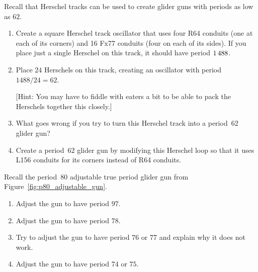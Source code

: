\begin{multicols}{2}
	
	\mfilbreak
	
	
	\begin{problem}\label{exer:p62_gun_problem}
		Recall that Herschel tracks can be used to create glider guns with periods as low as $62$.\smallskip
		
		\begin{enumerate}[label=\bf\color{ocre}(\alph*)]
			\item {} Create a square Herschel track oscillator that uses four R64 conduits (one at each of its corners) and 16 Fx77 conduits (four on each of its sides). If you place just a single Herschel on this track, it should have period $1{\,}488$.
			
			\item {} Place $24$ Herschels on this track, creating an oscillator with period $1488/24 = 62$.
			
			[Hint: You may have to fiddle with eaters a bit to be able to pack the Herschels together this closely.]
			
			\item {} What goes wrong if you try to turn this Herschel track into a period~62 glider gun? %
			
			\item {} Create a period~$62$ glider gun by modifying this Herschel loop so that it uses L156 conduits for its corners instead of R64 conduits.
		\end{enumerate}
	\end{problem}
	
	
	\mfilbreak
	
	
	\begin{problemstar}\label{exer:p80_adjustable_manipulate} 
		Recall the period~$80$ adjustable true period glider gun from Figure~\ref{fig:p80_adjustable_gun}.\smallskip
		
		\begin{enumerate}[label=\bf\color{ocre}(\alph*)]
			\item Adjust the gun to have period $97$.
			
			\item Adjust the gun to have period $78$.
			
			\item Try to adjust the gun to have period $76$ or $77$ and explain why it does not work.
			
			\item Adjust the gun to have period $74$ or $75$.
			

\end{enumerate}
\end{problemstar}
\end{multicols}
